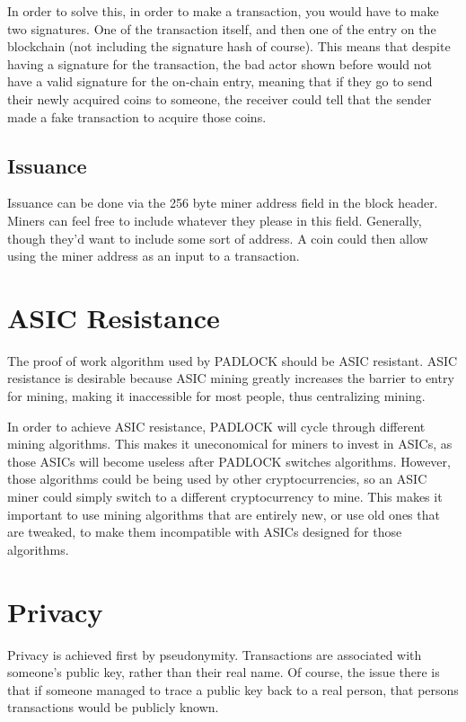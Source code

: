 \documentclass[12pt, letterpaper]{article}
\begin{document}
In order to solve this, in order to make a transaction, you would have to make
two signatures. One of the transaction itself, and then one of the entry on the
blockchain (not including the signature hash of course). This means that
despite having a signature for the transaction, the bad actor shown before would
not have a valid signature for the on-chain entry, meaning that if they go to
send their newly acquired coins to someone, the receiver could tell that the
sender made a fake transaction to acquire those coins.

\subsection{Issuance}
Issuance can be done via the 256 byte miner address field in the block header.
Miners can feel free to include whatever they please in this field. Generally,
though they'd want to include some sort of address. A coin could then allow
using the miner address as an input to a transaction.


\section{ASIC Resistance}
The proof of work algorithm used by PADLOCK should be ASIC resistant. 
ASIC resistance is desirable because ASIC mining greatly increases the 
barrier to entry for mining, making it inaccessible for
most people, thus centralizing mining.

In order to achieve ASIC resistance, PADLOCK will cycle through different mining
algorithms. This makes it uneconomical for miners to invest in ASICs, as those
ASICs will become useless after PADLOCK switches algorithms. However, those
algorithms could be being used by other cryptocurrencies, so an ASIC miner could
simply switch to a different cryptocurrency to mine. This makes it important to
use mining algorithms that are entirely new, or use old ones that are tweaked,
to make them incompatible with ASICs designed for those algorithms.


\section{Privacy}
Privacy is achieved first by pseudonymity. Transactions are associated with
someone's public key, rather than their real name. Of course, the issue there is
that if someone managed to trace a public key back to a real person, that
persons transactions would be publicly known.
\end{document}
